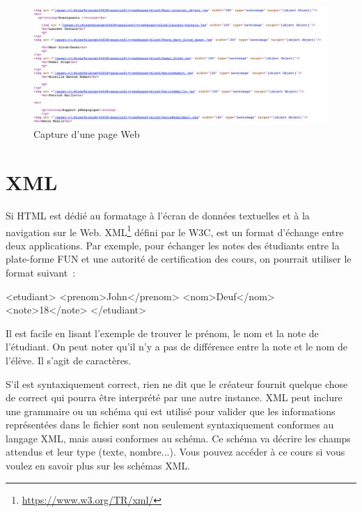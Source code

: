 \begin{figure}[tbp]
\centerline{\includegraphics[width=1\columnwidth]{Pictures/Capture23.png}}
\caption{Capture d'une page Web}
\label{fig-Web-HTML}
\end{figure}


\section{XML}

Si \ac{HTML} est dédié au formatage à l'écran de données textuelles et à la navigation sur le Web. \ac{XML}\footnote{\url{https://www.w3.org/TR/xml/}} défini par le \ac{W3C}, est un format d’échange entre deux applications. Par exemple, pour échanger les notes des étudiants entre la plate-forme FUN et une autorité de certification des cours, on pourrait utiliser le format suivant~:

\begin{termc}[backgroundcolor=\color{palerod}]
<etudiant>
   <prenom>John</prenom>
   <nom>Deuf</nom>
   <note>18</note>
</etudiant>

\end{termc}

Il est facile en lisant l'exemple de trouver le prénom, le nom et la note de l'étudiant. On peut noter qu'il n'y a pas de différence entre la note et le nom de l'élève. Il s'agit de caractères.

     \vspace{1em}

S'il est syntaxiquement correct, rien ne dit que le créateur fournit quelque chose de correct qui pourra être interprété par une autre instance.  \ac{XML} peut inclure une grammaire ou un schéma qui est utilisé pour valider que les informations représentées dans le fichier sont non seulement syntaxiquement conformes au langage \ac{XML}, mais aussi conformes au schéma. Ce schéma va décrire les champs attendus et leur type (texte, nombre...). Vous pouvez accéder à ce cours si vous voulez en savoir plus sur les schémas \ac{XML}.


